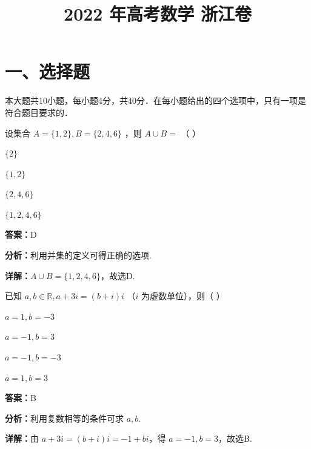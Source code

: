 ﻿\title{2022 年高考数学 浙江卷}
\date{}
\maketitle

\section*{一、选择题}
本大题共10小题，每小题4分，共40分．在每小题给出的四个选项中，只有一项是符合题目要求的．

\begin{question}[points=4]
设集合 $A = \{1,2\}, B = \{2,4,6\}$ ，则 $A \cup B =$ （ ）
\begin{choices}
  \item $\{2\}$
  \item $\{1,2\}$
  \item $\{2,4,6\}$
  \item $\{1,2,4,6\}$
\end{choices}
\begin{solution}
\textbf{答案：}D

\textbf{分析：}利用并集的定义可得正确的选项.

\textbf{详解：}$A \cup B = \{1,2,4,6\}$，故选D.
\end{solution}
\end{question}

\begin{question}[points=4]
已知 $a,b \in \mathbb{R}, a+3i = (b+i)i$ （$i$ 为虚数单位），则（ ）
\begin{choices}
  \item $a = 1, b = -3$
  \item $a = -1, b = 3$
  \item $a = -1, b = -3$
  \item $a = 1, b = 3$
\end{choices}
\begin{solution}
\textbf{答案：}B

\textbf{分析：}利用复数相等的条件可求 $a,b$.

\textbf{详解：}由 $a+3i = (b+i)i = -1 + bi$，得 $a = -1, b = 3$，故选B.
\end{solution}
\end{question}

